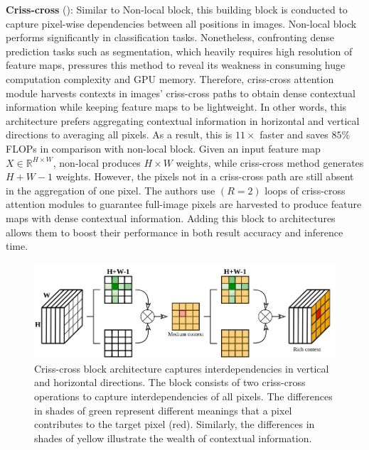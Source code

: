 \textbf{Criss-cross} (\textcolor{cyan}{\cite{huang2019ccnet}}):
Similar to Non-local block, this building block is conducted to capture pixel-wise dependencies between all positions in images. Non-local block performs significantly in classification tasks. Nonetheless, confronting dense prediction tasks such as segmentation, which heavily requires high resolution of feature maps, pressures this method to reveal its weakness in consuming huge computation complexity and GPU memory. Therefore, criss-cross attention module harvests contexts in images’ criss-cross paths to obtain dense contextual information while keeping feature maps to be lightweight. In other words, this architecture prefers aggregating contextual information in horizontal and vertical directions to averaging all pixels. As a result, this is $11\times$ faster and saves $85\%$ FLOPs in comparison with non-local block. Given an input feature map $X \in \mathbb{R}^{H \times W}$, non-local produces $H \times W$ weights, while criss-cross method generates $H+W-1$ weights. However, the pixels not in a criss-cross path are still absent in the aggregation of one pixel. The authors use $(R=2)$ loops of criss-cross attention modules to guarantee full-image pixels are harvested to produce feature maps with dense contextual information. Adding this block to architectures allows them to boost their performance in both result accuracy and inference time.
\begin{figure}[h!]
 	\centering	
 	\includegraphics[width= 0.8\linewidth]{figs/criss-cross.png}
 	\caption{Criss-cross block architecture captures interdependencies in vertical and horizontal directions. The block consists of two criss-cross operations to capture interdependencies of all pixels. The differences in shades of green represent different meanings that a pixel contributes to the target pixel (red). Similarly, the differences in shades of yellow illustrate the wealth of contextual information.}
 	\label{fig:criss-cross}
\end{figure}


